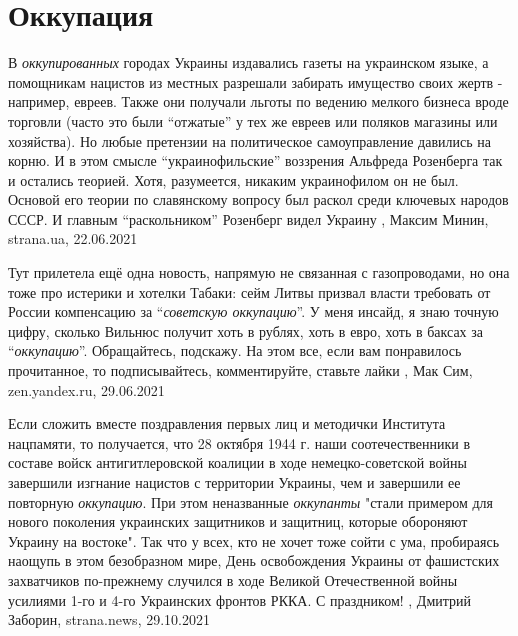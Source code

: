  
 
 
 
 
\chapter{Оккупация}
\label{sec:slova.okkupacia}

В \emph{оккупированных} городах Украины издавались газеты на украинском языке,
а помощникам нацистов из местных разрешали забирать имущество своих жертв -
например, евреев. Также они получали льготы по ведению мелкого бизнеса вроде
торговли (часто это были \enquote{отжатые} у тех же евреев или поляков магазины или
хозяйства).  Но любые претензии на политическое самоуправление давились на
корню. И в этом смысле \enquote{украинофильские} воззрения Альфреда Розенберга так и
остались теорией. Хотя, разумеется, никаким украинофилом он не был. Основой его
теории по славянскому вопросу был раскол среди ключевых народов СССР. И главным
\enquote{раскольником} Розенберг видел Украину 
  , Максим Минин, strana.ua, 22.06.2021


Тут прилетела ещё одна новость, напрямую не связанная с газопроводами, но она
тоже про истерики и хотелки Табаки: сейм Литвы призвал власти требовать от
России компенсацию за \enquote{\emph{советскую оккупацию}}. У меня инсайд, я
знаю точную цифру, сколько Вильнюс получит хоть в рублях, хоть в евро, хоть в
баксах за \enquote{\emph{оккупацию}}. Обращайтесь, подскажу.  На этом все, если
вам понравилось прочитанное, то подписывайтесь, комментируйте, ставьте лайки
, 
Мак Сим, zen.yandex.ru, 29.06.2021

Если сложить вместе поздравления первых лиц и методички Института нацпамяти, то
получается, что 28 октября 1944 г. наши соотечественники в составе войск
антигитлеровской коалиции в ходе немецко-советской войны завершили изгнание
нацистов с территории Украины, чем и завершили ее повторную \emph{оккупацию}. При этом
неназванные \emph{оккупанты} "стали примером для нового поколения украинских
защитников и защитниц, которые обороняют Украину на востоке".  Так что у всех,
кто не хочет тоже сойти с ума, пробираясь наощупь в этом безобразном мире, День
освобождения Украины от фашистских захватчиков по-прежнему случился в ходе
Великой Отечественной войны усилиями 1-го и 4-го Украинских фронтов РККА.  С
праздником!
, 
Дмитрий Заборин, strana.news, 29.10.2021
